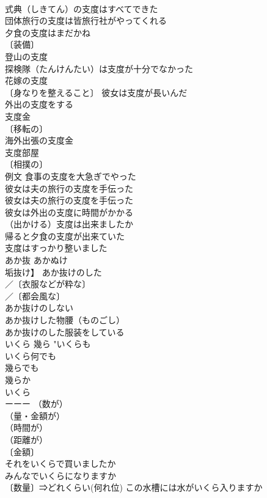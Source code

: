 \documentclass[8pt]{extreport}
\begin{document}
\begin{CJK}{UTF8}{min}
\\	式典（しきてん）の支度はすべてできた 
\\	団体旅行の支度は皆旅行社がやってくれる 
\\	夕食の支度はまだかね 
\\	〔装備〕
\\	登山の支度 
\\	探検隊（たんけんたい）は支度が十分でなかった 
\\	花嫁の支度 
\\	〔身なりを整えること〕 彼女は支度が長いんだ 
\\	外出の支度をする 
\\	支度金 
\\	〔移転の〕
\\	海外出張の支度金 
\\	支度部屋 
\\	〔相撲の〕
\\	例文 食事の支度を大急ぎでやった 
\\	彼女は夫の旅行の支度を手伝った 
\\	彼女は夫の旅行の支度を手伝った 
\\	彼女は外出の支度に時間がかかる 
\\	（出かける）支度は出来ましたか 
\\	帰ると夕食の支度が出来ていた 
\\	支度はすっかり整いました 
\\	あか抜	あかぬけ
\\	垢抜け】	あか抜けのした 
\\	／〔衣服などが粋な〕
\\	／〔都会風な〕
\\	あか抜けのしない 
\\	あか抜けした物腰（ものごし） 
\\	あか抜けのした服装をしている 
\\	いくら	幾ら	"いくらも　
\\	いくら何でも　
\\	幾らでも　
\\	幾らか　
\\	いくら　
\\	ーーー （数が）
\\	（量・金額が）
\\	（時間が）
\\	（距離が）
\\	〔金額〕
\\	それをいくらで買いましたか 
\\	みんなでいくらになりますか 
\\	〔数量〕⇒どれくらい(何れ位) この水槽には水がいくら入りますか 

\end{CJK}
\end{document}
